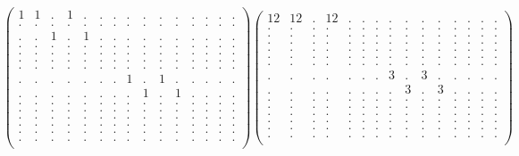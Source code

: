 \documentclass[12pt,a4paper]{amsart}
\begin{document}
\begin{align*}
\left(\begin{array}{rrrrrrrrrrrrrrr}%
1&1&.&1&.&.&.&.&.&.&.&.&.&.&.\\%
.&.&.&.&.&.&.&.&.&.&.&.&.&.&.\\%
.&.&1&.&1&.&.&.&.&.&.&.&.&.&.\\%
.&.&.&.&.&.&.&.&.&.&.&.&.&.&.\\%
.&.&.&.&.&.&.&.&.&.&.&.&.&.&.\\%
.&.&.&.&.&.&.&.&.&.&.&.&.&.&.\\%
.&.&.&.&.&.&.&.&.&.&.&.&.&.&.\\%
.&.&.&.&.&.&.&1&.&1&.&.&.&.&.\\%
.&.&.&.&.&.&.&.&1&.&1&.&.&.&.\\%
.&.&.&.&.&.&.&.&.&.&.&.&.&.&.\\%
.&.&.&.&.&.&.&.&.&.&.&.&.&.&.\\%
.&.&.&.&.&.&.&.&.&.&.&.&.&.&.\\%
.&.&.&.&.&.&.&.&.&.&.&.&.&.&.\\%
.&.&.&.&.&.&.&.&.&.&.&.&.&.&.\\%
.&.&.&.&.&.&.&.&.&.&.&.&.&.&.\\%
\end{array}\right)%
\left(\begin{array}{rrrrrrrrrrrrrrr}%
12&12&.&12&.&.&.&.&.&.&.&.&.&.&.\\%
.&.&.&.&.&.&.&.&.&.&.&.&.&.&.\\%
.&.&.&.&.&.&.&.&.&.&.&.&.&.&.\\%
.&.&.&.&.&.&.&.&.&.&.&.&.&.&.\\%
.&.&.&.&.&.&.&.&.&.&.&.&.&.&.\\%
.&.&.&.&.&.&.&.&.&.&.&.&.&.&.\\%
.&.&.&.&.&.&.&.&.&.&.&.&.&.&.\\%
.&.&.&.&.&.&.&3&.&3&.&.&.&.&.\\%
.&.&.&.&.&.&.&.&3&.&3&.&.&.&.\\%
.&.&.&.&.&.&.&.&.&.&.&.&.&.&.\\%
.&.&.&.&.&.&.&.&.&.&.&.&.&.&.\\%
.&.&.&.&.&.&.&.&.&.&.&.&.&.&.\\%
.&.&.&.&.&.&.&.&.&.&.&.&.&.&.\\%
.&.&.&.&.&.&.&.&.&.&.&.&.&.&.\\%
.&.&.&.&.&.&.&.&.&.&.&.&.&.&.\\%
\end{array}\right)%
\end{align*}
\end{document}
